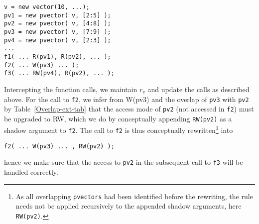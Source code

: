 \documentclass[preprint,12pt]{elsarticle}
\newcommand{\TODO}[1]{\textcolor{red}{\textbf{[TODO:#1]}}}
\begin{document}
\begin{verbatim}
v = new vector(10, ...);
pv1 = new pvector( v, [2:5] );
pv2 = new pvector( v, [4:8] );
pv3 = new pvector( v, [7:9] );
pv4 = new pvector( v, [2:3] );
...
f1( ... R(pv1), R(pv2), ... );
f2( ... W(pv3) ... );  
f3( ... RW(pv4), R(pv2), ... );
\end{verbatim}

Intercepting the function calls, we maintain $r_v$ and update the calls as 
described above.
For the call to \verb.f2., we infer from W(pv3) and the overlap of \verb.pv3. with \verb.pv2.
by Table~\ref{Overlap-ext-tab} that the access mode of \verb.pv2. (not accessed in \verb.f2.) must be 
upgraded to RW, which we do by conceptually appending \verb.RW(pv2).
as a shadow argument to \verb.f2.. The call to \verb.f2. is thus
conceptually rewritten\footnote{As all overlapping
\texttt{pvectors} had been identified before the rewriting, the rule needs
not be applied recursively to the appended shadow arguments, here \texttt{RW(pv2)}.} into

\begin{verbatim}
f2( ... W(pv3) ... , RW(pv2) ); 
\end{verbatim}

\noindent
hence we make sure that the access to \verb.pv2. in the subsequent
call to \verb.f3. will be handled correctly. 

 
\end{document}
